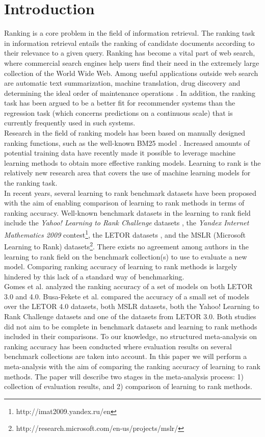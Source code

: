 \documentclass{llncs}
\begin{document}
\section{Introduction}
Ranking is a core problem in the field of information retrieval. The ranking task in information retrieval entails the ranking of candidate documents according to their relevance to a given query. Ranking has become a vital part of web search, where commercial search engines help users find their need in the extremely large collection of the World Wide Web. Among useful applications outside web search are automatic text summarization, machine translation, drug discovery and determining the ideal order of maintenance operations \cite{Rudin2009}. In addition, the ranking task has been argued to be a better fit for recommender systems than the regression task \cite{McNee2006} (which concerns predictions on a continuous scale) that is currently frequently used in such systems.\\
Research in the field of ranking models has been based on manually designed ranking functions, such as the well-known BM25 model \cite{Robertson1994}. Increased amounts of potential training data have recently made it possible to leverage machine learning methods to obtain more effective ranking models. Learning to rank is the relatively new research area that covers the use of machine learning models for the ranking task.\\
In recent years, several learning to rank benchmark datasets have been proposed with the aim of enabling comparison of learning to rank methods in terms of ranking accuracy. Well-known benchmark datasets in the learning to rank field include the \emph{Yahoo! Learning to Rank Challenge} datasets \cite{Chapelle2011a}, the \emph{Yandex Internet Mathematics 2009} contest\footnote{http://imat2009.yandex.ru/en}, the LETOR datasets \cite{Qin2010}, and the MSLR (Microsoft Learning to Rank) datasets\footnote{http://research.microsoft.com/en-us/projects/mslr/}. There exists no agreement among authors in the learning to rank field on the benchmark collection(s) to use to evaluate a new model. Comparing ranking accuracy of learning to rank methods is largely hindered by this lack of a standard way of benchmarking.\\
Gomes et al. \cite{Gomes2013} analyzed the ranking accuracy of a set of models on both LETOR 3.0 and 4.0. Busa-Fekete et al. \cite{Busa-Fekete2013} compared the accuracy of a small set of models over the LETOR 4.0 datasets, both MSLR datasets, both the Yahoo! Learning to Rank Challenge datasets and one of the datasets from LETOR 3.0. Both studies did not aim to be complete in benchmark datasets and learning to rank methods included in their comparisons. To our knowledge, no structured meta-analysis on ranking accuracy has been conducted where evaluation results on several benchmark collections are taken into account. In this paper we will perform a meta-analysis with the aim of comparing the ranking accuracy of learning to rank methods. The paper will describe two stages in the meta-analysis process: 1) collection of evaluation results, and 2) comparison of learning to rank methods.
\vspace{-0.08in}
\end{document}
